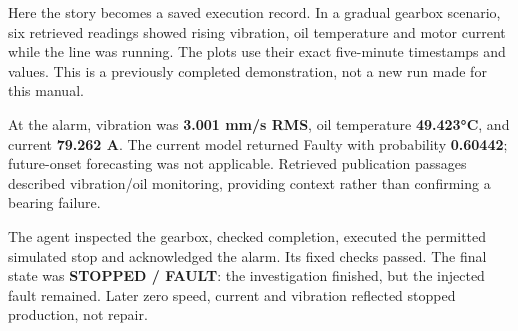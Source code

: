 Here the story becomes a saved execution record. In a gradual gearbox scenario, six retrieved readings showed rising vibration, oil temperature and motor current while the line was running. The plots use their exact five-minute timestamps and values. This is a previously completed demonstration, not a new run made for this manual.

At the alarm, vibration was \textbf{3.001 mm/s RMS}, oil temperature \textbf{49.423°C}, and current \textbf{79.262 A}. The current model returned Faulty with probability \textbf{0.60442}; future-onset forecasting was not applicable. Retrieved publication passages described vibration/oil monitoring, providing context rather than confirming a bearing failure.

The agent inspected the gearbox, checked completion, executed the permitted simulated stop and acknowledged the alarm. Its fixed checks passed. The final state was \textbf{STOPPED / FAULT}: the investigation finished, but the injected fault remained. Later zero speed, current and vibration reflected stopped production, not repair.

